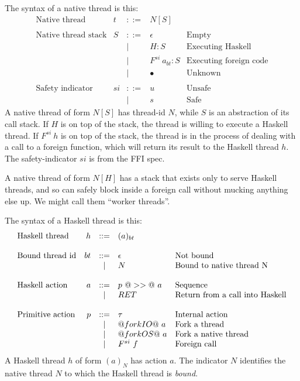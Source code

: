 \documentclass[a4paper,twoside]{article}
\newcommand{\hcall}{H}
\newcommand{\fcall}[2]{F^{#1}~#2}
\newcommand{\ret}[1]{RET~#1}
\begin{document}
The syntax of a native thread is this:
$$
\begin{array}{lrcll}
\mbox{Native thread} &  t & ::= & N[S] \\
\\
\mbox{Native thread stack} &  S & ::= & \epsilon & \mbox{Empty}\\
        & & | & \hcall : S  & \mbox{Executing Haskell} \\
        & & | & \fcall{si}{a_{bt}} : S & \mbox{Executing foreign code} \\
        & & | & \bullet & \mbox{Unknown}\\
\\
\mbox{Safety indicator} &  si & ::= & u & \mbox{Unsafe} \\
        & & | & s & \mbox{Safe}
\end{array}
$$
A native thread of form $N[S]$ has thread-id $N$, while $S$ is
an abstraction of its call stack.  If $\hcall$ is on top of the stack,
the thread is willing to execute a Haskell thread. 
If $\fcall{si}{h}$ is
on top of the stack, the thread is in the process of dealing with a call
to a foreign function, which will return its result to the Haskell thread
$h$.  The safety-indicator $si$ is from the FFI spec.

A native thread of form $N[H]$ has a stack that exists only to serve Haskell 
threads, and so can safely block inside a foreign call without mucking anything
else up.  We might call them ``worker threads''.

The syntax of a Haskell thread is this:
$$
\begin{array}{lrcll}
\mbox{Haskell thread} &  h & ::= & (a)_{bt} \\
\\
\mbox{Bound thread id} & bt & ::= & \epsilon & \mbox{Not bound} \\
        & & | & N & \mbox{Bound to native thread N} \\
\\
\mbox{Haskell action} &  a & ::= & p ~@>>@~ a  & \mbox{Sequence} \\
        & & | & \ret  & \mbox{Return from a call into Haskell} \\
\\
\mbox{Primitive action} &  p & ::= & \tau & \mbox{Internal action} \\
        & & | & @forkIO@~a & \mbox{Fork a thread} \\
        & & | & @forkOS@~a & \mbox{Fork a native thread} \\
        & & | & \fcall{si}{f} & \mbox{Foreign call} 
\end{array}
$$
A Haskell thread $h$ of form $(a)_{N}$ has action $a$.  The indicator
$N$ identifies the native thread $N$ to which the Haskell thread is \emph{bound}.
\end{document}
